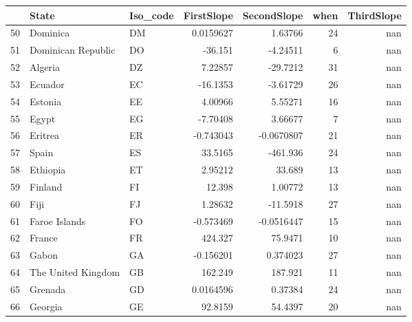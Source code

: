 \begin{tabular}{rllrrrr}
\hline
    & State                      & Iso\_code   &    FirstSlope &   SecondSlope &   when &   ThirdSlope \\
\hline
 50 & Dominica                   & DM         &    0.0159627  &     1.63766   &     24 &          nan \\
 51 & Dominican Republic         & DO         &  -36.151      &    -4.24511   &      6 &          nan \\
 52 & Algeria                    & DZ         &    7.22857    &   -29.7212    &     31 &          nan \\
 53 & Ecuador                    & EC         &  -16.1353     &    -3.61729   &     26 &          nan \\
 54 & Estonia                    & EE         &    4.00966    &     5.55271   &     16 &          nan \\
 55 & Egypt                      & EG         &   -7.70408    &     3.66677   &      7 &          nan \\
 56 & Eritrea                    & ER         &   -0.743043   &    -0.0670807 &     21 &          nan \\
 57 & Spain                      & ES         &   33.5165     &  -461.936     &     24 &          nan \\
 58 & Ethiopia                   & ET         &    2.95212    &    33.689     &     13 &          nan \\
 59 & Finland                    & FI         &   12.398      &     1.00772   &     13 &          nan \\
 60 & Fiji                       & FJ         &    1.28632    &   -11.5918    &     27 &          nan \\
 61 & Faroe Islands              & FO         &   -0.573469   &    -0.0516447 &     15 &          nan \\
 62 & France                     & FR         &  424.327      &    75.9471    &     10 &          nan \\
 63 & Gabon                      & GA         &   -0.156201   &     0.374023  &     27 &          nan \\
 64 & The United Kingdom         & GB         &  162.249      &   187.921     &     11 &          nan \\
 65 & Grenada                    & GD         &    0.0164596  &     0.37384   &     24 &          nan \\
 66 & Georgia                    & GE         &   92.8159     &    54.4397    &     20 &          nan \\

\end{tabular}
